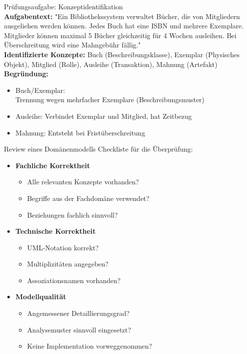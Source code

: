\begin{example2}{Prüfungsaufgabe: Konzeptidentifikation}\\
\textbf{Aufgabentext:} 
"Ein Bibliothekssystem verwaltet Bücher, die von Mitgliedern ausgeliehen werden können. Jedes Buch hat eine ISBN und mehrere Exemplare. Mitglieder können maximal 5 Bücher gleichzeitig für 4 Wochen ausleihen. Bei Überschreitung wird eine Mahngebühr fällig."
\vspace{2mm}\\
\textbf{Identifizierte Konzepte:}
Buch (Beschreibungsklasse), Exemplar (Physisches Objekt), Mitglied (Rolle), Ausleihe (Transaktion), Mahnung (Artefakt)
\vspace{2mm}\\
\textbf{Begründung:}
\begin{itemize}
    \item Buch/Exemplar: \\ Trennung wegen mehrfacher Exemplare (Beschreibungsmuster)
    \item Ausleihe: Verbindet Exemplar und Mitglied, hat Zeitbezug
    \item Mahnung: Entsteht bei Fristüberschreitung
\end{itemize}
\end{example2}

\columnbreak


\begin{concept}{Review eines Domänenmodells}
Checkliste für die Überprüfung:
\begin{itemize}
    \item \textbf{Fachliche Korrektheit}
    \begin{itemize}
        \item Alle relevanten Konzepte vorhanden?
        \item Begriffe aus der Fachdomäne verwendet?
        \item Beziehungen fachlich sinnvoll?
    \end{itemize}
    
    \item \textbf{Technische Korrektheit}
    \begin{itemize}
        \item UML-Notation korrekt?
        \item Multiplizitäten angegeben?
        \item Assoziationsnamen vorhanden?
    \end{itemize}
    
    \item \textbf{Modellqualität}
    \begin{itemize}
        \item Angemessener Detaillierungsgrad?
        \item Analysemuster sinnvoll eingesetzt?
        \item Keine Implementation vorweggenommen?
    \end{itemize}
\end{itemize}
\end{concept}

